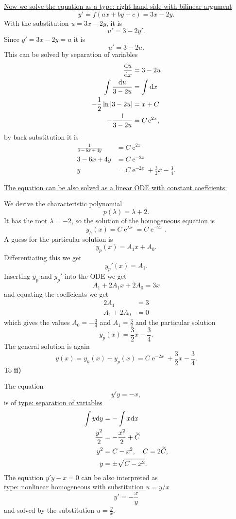 {\begin{itemize}
\underline{Now we solve the equation as a type: right hand side with bilinear argument}
$$
y'=f(ax+by+c)=3x-2y.
$$
With the substitution $u=3x-2y$, it is
$$
u'= 3 -2y'.
$$
Since $y'=3x-2y=u$ it is 
$$
u'= 3-2u.
$$
This can be solved by separation of variables
\begin{align*}
\frac{\mathrm{d} u}{\mathrm{d} x} &= 3-2u\\
 \int \frac{\mathrm{d} u}{3-2u} &= \int \mathrm{d} x\\
 -\frac{1}{2} \ln |3-2u| &= x + C\\
 -\frac{1}{3-2u} &= C\operatorname{e}^{2x},
\end{align*}
by back substitution it is
\begin{align*}
\frac{1}{3-6x+4y} &= C \operatorname{e}^{2x}\\
3-6x+4y &= C \operatorname{e}^{-2x}\\
y &= C\operatorname{e}^{-2x} +\frac{3}{2}x - \frac{3}{4}.
\end{align*}

\newpage
\underline{The equation can be also solved as a linear ODE with constant coeffcients:}

We derive the characteristic polynomial
$$
p(\lambda) = \lambda + 2.
$$
It has the root $\lambda = -2$, so the solution of the homogeneous equation is
$$
y_h(x) = C\operatorname{e}^{\lambda x} = C \operatorname{e}^{-2x}.
$$
A guess for the particular solution is 
$$
y_p(x) = A_1x + A_0.
$$
Differentiating this we get
$$
y_p'(x) = A_1.
$$
Inserting $y_p$ and $y_p'$ into the ODE we get
$$
A_1+2A_1x+2A_0 = 3x
$$
and equating the coeffcients we get
\begin{align*}
2A_1 &= 3\\
A_1+2A_0 &= 0
\end{align*}
which gives the values $A_0 = -\frac{3}{4}$ and $A_1 = \frac{3}{2}$ and the particular solution
$$
y_p(x) = \frac{3}{2}x-\frac{3}{4}.
$$
The general solution is again
$$
y(x) = y_h(x)+y_p(x) = C\operatorname{e}^{-2x} + \frac{3}{2}x-\frac{3}{4}.
$$
\noindent To \textbf{ii)}

The equation
$$
y'y = -x,
$$
is of \underline{type: separation of variables}
\begin{align*}
\int y \mathrm{d} y &= -\int x \mathrm{d} x\\
\frac{y^2}{2} &= -\frac{x^2}{2}+\widetilde C\\
y^2 &= C-x^2, \quad C = 2\widetilde C,\\
y &= \pm \sqrt{C-x^2}.
\end{align*}
The equation $y'y-x=0$ can be also interpreted as\\
\underline{type: nonlinear homogeneous with substitution $u=y/x$}
$$
y' = -\frac{x}{y}
$$ 
and solved by the substitution $u=\frac{y}{x}$.


\end{itemize}}

